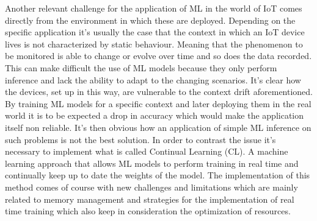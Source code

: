 \documentclass[12pt]{report}
\begin{document}
Another relevant challenge for the application of ML in the world of IoT comes directly from the environment in which these are deployed. Depending on the specific application it's usually the case that the context in which an IoT device lives is not characterized by static behaviour. Meaning that the phenomenon to be monitored is able to change or evolve over time and so does the data recorded. This can make difficult the use of ML models because they only perform inference and lack the ability to adapt to the changing scenarios. It's clear how the devices, set up in this way, are vulnerable to the context drift aforementioned. 
By training ML models for a specific context and later deploying them in the real world it is to be expected a drop in accuracy which would make the application itself non reliable. It's then obvious how an application of simple ML inference on such problems is not the best solution. In order to contrast the issue it's necessary to implement what is called Continual Learning (CL). A machine learning approach that allows ML models to perform training in real time and continually keep up to date the weights of the model. The implementation of this method comes of course with new challenges and limitations which are mainly related to memory management and strategies for the implementation of real time training which also keep in consideration the optimization of resources.
\bigskip
\end{document}
